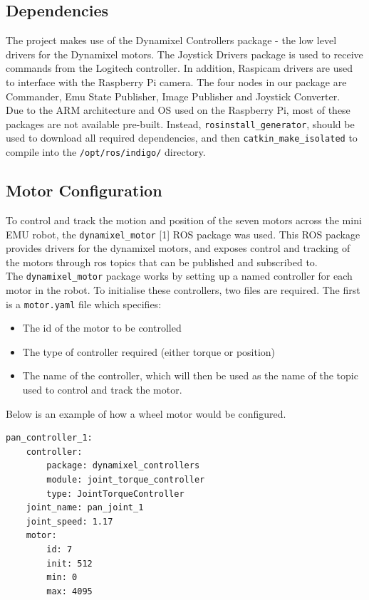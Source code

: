 \documentclass[titlepage,12pt,a4paper]{article}
\begin{document}
\subsection{Dependencies}

\noindent The project makes use of the Dynamixel Controllers package - the low level drivers for the Dynamixel motors. The Joystick Drivers package is used to receive commands from the Logitech controller. In addition, Raspicam drivers are used to interface with the Raspberry Pi camera.
The four nodes in our package are Commander, Emu State Publisher, Image Publisher and Joystick Converter.\\

\noindent Due to the ARM architecture and OS used on the Raspberry Pi, most of these packages are not available pre-built. Instead, \texttt{rosinstall\_generator}, should be used to download all required dependencies, and then \texttt{catkin\_make\_isolated} to compile into the \texttt{/opt/ros/indigo/} directory.

\subsection{Motor Configuration}
To control and track the motion and position of the seven motors across the mini EMU robot, the \texttt{dynamixel\_motor} [1] ROS package was used. This ROS package provides drivers for the dynamixel motors, and exposes control and tracking of the motors through ros topics that can be published and subscribed to. \\

\noindent The \texttt{dynamixel\_motor} package works by setting up a named controller for each motor in the robot. To initialise these controllers, two files are required. The first is a \texttt{motor.yaml} file which specifies:
\begin{itemize}
    \item The id of the motor to be controlled
    \item The type of controller required (either torque or position)
    \item The name of the controller, which will then be used as the name of the topic used to control and track the motor.
\end{itemize}
Below is an example of how a wheel motor would be configured.

\begin{lstlisting}
pan_controller_1:
    controller:
        package: dynamixel_controllers
        module: joint_torque_controller
        type: JointTorqueController
    joint_name: pan_joint_1
    joint_speed: 1.17
    motor:
        id: 7
        init: 512
        min: 0
        max: 4095
\end{lstlisting}
\end{document}
